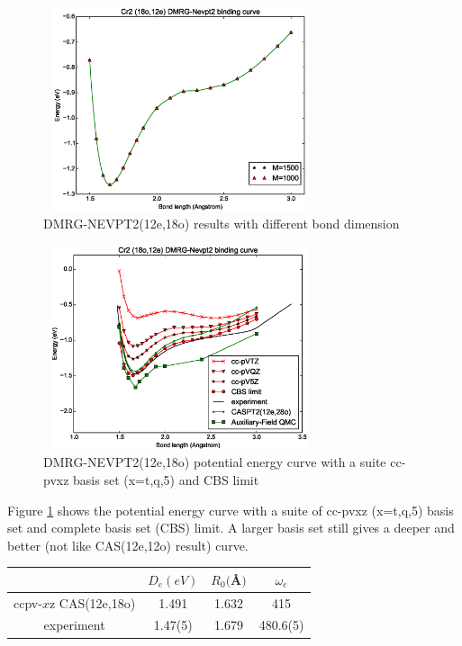 \begin{figure}
\includegraphics[width=8cm,height=6cm]{application/M1000-1500.eps}
  \caption{DMRG-NEVPT2(12e,18o) results with different bond dimension}

\end{figure}

\begin{figure}\label{fig:5qt_fitting}
  \includegraphics[width=8cm,height=6cm]{application/5qt-fitting.eps}
  \caption{DMRG-NEVPT2(12e,18o) potential energy curve with a suite cc-pvxz basis set (x=t,q,5) and CBS limit}
\end{figure}

Figure \ref{fig:5qt_fitting} shows the potential energy curve with a suite of cc-pvxz (x=t,q,5) basis set and complete basis set (CBS) limit. A larger basis set still gives a deeper and better (not like CAS(12e,12o) result) curve. 


\begin{table}
  \begin{tabular}{cccc}
  \toprule
      & $D_e(eV)$ & $R_0($\AA$)$ & $\omega_e$ \\
  \midrule
    ccpv-$x$z CAS(12e,18o) & 1.491 & 1.632 & 415 \\ 
  \midrule
  experiment & 1.47(5) & 1.679 & 480.6(5) \\
  \bottomrule
  \end{tabular}
\end{table}


